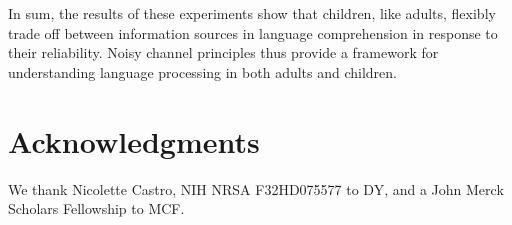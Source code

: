\documentclass[man,floatsintext]{apa6}
\begin{document}
In sum, the results of these experiments show that children, like adults, flexibly trade off between information sources in language comprehension in response to their reliability. Noisy channel principles thus provide a framework for understanding language processing in both adults and children.


\section{Acknowledgments}

We thank Nicolette Castro, NIH NRSA F32HD075577 to DY, and a John Merck Scholars Fellowship to MCF.



\end{document}
